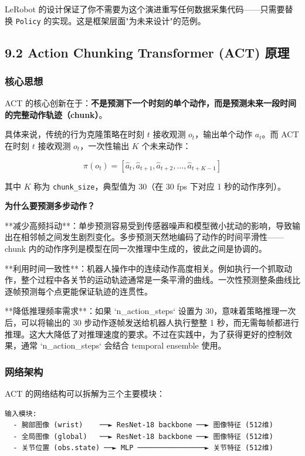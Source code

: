\documentclass[UTF8,a4paper,11pt]{ctexart}
\begin{document}
{LeRobot 的设计保证了你不需要为这个演进重写任何数据采集代码——只需要替换 \texttt{Policy} 的实现。这是框架层面"为未来设计"的范例。

\subsection{9.2 Action Chunking Transformer (ACT) 原理}

\subsubsection{核心思想}

ACT 的核心创新在于：\textbf{不是预测下一个时刻的单个动作，而是预测未来一段时间的完整动作轨迹（chunk）}。

具体来说，传统的行为克隆策略在时刻 $t$ 接收观测 $o_t$，输出单个动作 $a_t$。而 ACT 在时刻 $t$ 接收观测 $o_t$，一次性输出 $K$ 个未来动作：

$$\pi(o_t) = [\hat{a}_t, \hat{a}_{t+1}, \hat{a}_{t+2}, \ldots, \hat{a}_{t+K-1}]$$

其中 $K$ 称为 \texttt{chunk_size}，典型值为 30（在 30 fps 下对应 1 秒的动作序列）。

\textbf{为什么要预测多步动作？}

\item[1] **减少高频抖动**：单步预测容易受到传感器噪声和模型微小扰动的影响，导致输出在相邻帧之间发生剧烈变化。多步预测天然地编码了动作的时间平滑性——chunk 内的动作序列是模型在同一次推理中生成的，彼此之间是协调的。

\item[2] **利用时间一致性**：机器人操作中的连续动作高度相关。例如执行一个抓取动作，整个过程中各关节的运动轨迹通常是一条平滑的曲线。一次性预测整条曲线比逐帧预测每个点更能保证轨迹的连贯性。

\item[3] **降低推理频率需求**：如果 `n_action_steps` 设置为 30，意味着策略推理一次后，可以将输出的 30 步动作逐帧发送给机器人执行整整 1 秒，而无需每帧都进行推理。这大大降低了对推理速度的要求。不过在实践中，为了获得更好的控制效果，通常 `n_action_steps` 会结合 temporal ensemble 使用。

\subsubsection{网络架构}

ACT 的网络结构可以拆解为三个主要模块：

\begin{lstlisting}[language=text]
输入模块:
  - 腕部图像 (wrist)    ──► ResNet-18 backbone ──► 图像特征 (512维)
  - 全局图像 (global)   ──► ResNet-18 backbone ──► 图像特征 (512维)
  - 关节位置 (obs.state) ──► MLP ────────────────► 关节特征 (512维)


\end{lstlisting}}
\end{document}
